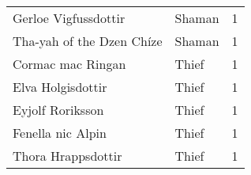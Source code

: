 \begin{tcolorbox}[breakable, title=Index by class]
\begin{supertabular}{p{0.6\columnwidth}lr}
Gerloe Vigfussdottir                               & Shaman          &     1\\
Tha-yah of the Dzen Ch\'ize                        & Shaman          &     1\\
Cormac mac Ringan                                  & Thief           &     1\\
Elva Holgisdottir                                  & Thief           &     1\\
Eyjolf Roriksson                                   & Thief           &     1\\
Fenella nic Alpin                                  & Thief           &     1\\
Thora Hrappsdottir                                 & Thief           &     1\\
\end{supertabular}
\end{tcolorbox}
